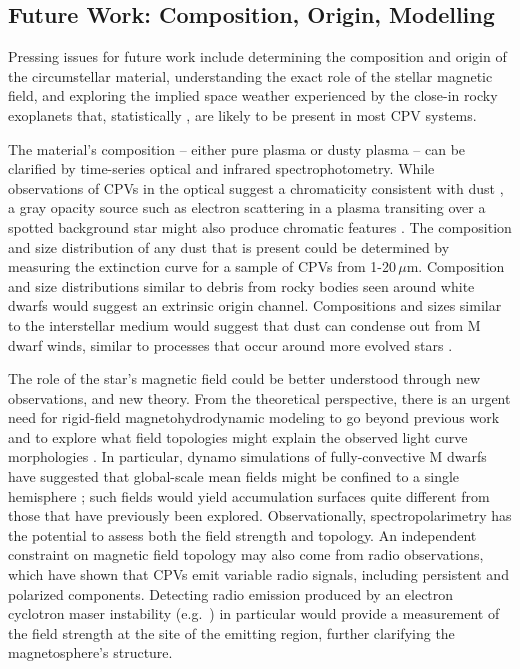 \documentclass[11pt,twocolumn,tighten,linenumbers]{aastex7}
\begin{document}
\subsection{Future Work: Composition, Origin, Modelling}

Pressing issues for future work include determining the composition
and origin of the circumstellar material, understanding the exact role
of the stellar magnetic field, and exploring the implied space weather
experienced by the close-in rocky exoplanets that, statistically
\citep{Dressing2015}, are likely to be present in most CPV systems.

The material's composition -- either pure plasma or dusty plasma --
can be clarified by time-series optical and infrared
spectrophotometry.  While observations of CPVs in the optical suggest
a chromaticity consistent with dust
\citep{Tanimoto2020,Gunther2022,Koen2023}, a gray opacity source such
as electron scattering in a plasma transiting over a spotted
background star might also produce chromatic features
\citep{Rackham2018}.  The composition and size distribution of any dust
that is present could be determined by measuring the extinction curve
for a sample of CPVs from 1-20\,$\mu$m.  Composition and size
distributions similar to debris from rocky bodies seen around white
dwarfs \citep{Reach2009} would suggest an extrinsic origin channel.
Compositions and sizes similar to the interstellar medium would
suggest that dust can condense out from M dwarf winds, similar to
processes that occur around more evolved stars \citep{Marigo2008}.

The role of the star's magnetic field could be better understood
through new observations, and new theory.  From the theoretical
perspective, there is an urgent need for rigid-field
magnetohydrodynamic modeling to go beyond previous work
\citep{Townsend2005,Townsend2008,Krticka2022} and to explore what field
topologies might explain the observed light curve morphologies
\citep{Bouma2024}.  In particular, dynamo simulations of
fully-convective M dwarfs have suggested that global-scale mean fields
might be confined to a single hemisphere \citep{Brown2020}; such fields
would yield accumulation surfaces quite different from those that have
previously been explored.  Observationally, spectropolarimetry has the
potential to assess both the field strength and topology.  An
independent constraint on magnetic field topology may also come from
radio observations, which have shown \citep{Kaur2024} that CPVs emit
variable radio signals, including persistent and polarized components.
Detecting radio emission produced by an electron cyclotron maser
instability (e.g.~\citealt{Callingham2021}) in particular would provide a
measurement of the field strength at the site of the emitting region,
further clarifying the magnetosphere's structure.
\end{document}
